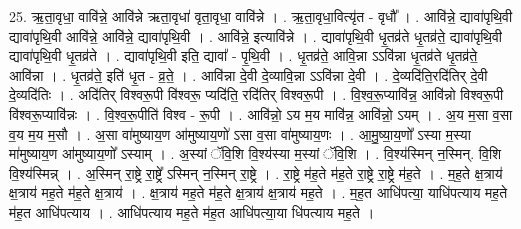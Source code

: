 \documentclass[17pt]{extarticle}
\begin{document}
25. ऋ॒ता॒वृधा॒ वावि॑न्ने॒ आवि॑न्ने ऋता॒वृधा॑ वृता॒वृधा॒ वावि॑न्ने । . ऋ॒ता॒वृधा॒वित्यृ॑त - वृधौ᳚ । . आवि॑न्ने॒ द्यावा॑पृथि॒वी द्यावा॑पृथि॒वी आवि॑न्ने॒ आवि॑न्ने॒ द्यावा॑पृथि॒वी । . आवि॑न्ने॒ इत्यावि॑न्ने । . द्यावा॑पृथि॒वी धृ॒तव्र॑ते धृ॒तव्र॑ते॒ द्यावा॑पृथि॒वी द्यावा॑पृथि॒वी धृ॒तव्र॑ते । . द्यावा॑पृथि॒वी इति॒ द्यावा᳚ - पृ॒थि॒वी । . धृ॒तव्र॑ते॒ आवि॒न्ना ऽऽवि॑न्ना धृ॒तव्र॑ते धृ॒तव्र॑ते॒ आवि॑न्ना । . धृ॒तव्र॑ते॒ इति॑ धृ॒त - व्र॒ते॒ । . आवि॑न्ना दे॒वी दे॒व्यावि॒न्ना ऽऽवि॑न्ना दे॒वी । . दे॒व्यदि॑ति॒रदि॑तिर् दे॒वी दे॒व्यदि॑तिः । . अदि॑तिर् विश्वरू॒पी वि॑श्वरू॒ प्यदि॑ति॒ रदि॑तिर् विश्वरू॒पी । . वि॒श्व॒रू॒प्यावि॑न्न॒ आवि॑न्नो विश्वरू॒पी वि॑श्वरू॒प्यावि॑न्नः । . वि॒श्व॒रू॒पीति॑ विश्व - रू॒पी । . आवि॑न्नो॒ ऽय म॒य मावि॑न्न॒ आवि॑न्नो॒ ऽयम् । . अ॒य म॒सा व॒सा व॒य म॒य म॒सौ । . अ॒सा वा॑मुष्याय॒ण आ॑मुष्याय॒णो॑ ऽसा व॒सा वा॑मुष्याय॒णः । . आ॒मु॒ष्या॒य॒णो᳚ ऽस्या म॒स्या मा॑मुष्याय॒ण आ॑मुष्याय॒णो᳚ ऽस्याम् । . अ॒स्यां ॅवि॒शि वि॒श्य॑स्या म॒स्यां ॅवि॒शि । . वि॒श्य॑स्मिन् न॒स्मिन्. वि॒शि वि॒श्य॑स्मिन्न् । . अ॒स्मिन् रा॒ष्ट्रे रा॒ष्ट्रे᳚ ऽस्मिन् न॒स्मिन् रा॒ष्ट्रे । . रा॒ष्ट्रे म॑ह॒ते म॑ह॒ते रा॒ष्ट्रे रा॒ष्ट्रे म॑ह॒ते । . म॒ह॒ते क्ष॒त्राय॑ क्ष॒त्राय॑ मह॒ते म॑ह॒ते क्ष॒त्राय॑ । . क्ष॒त्राय॑ मह॒ते म॑ह॒ते क्ष॒त्राय॑ क्ष॒त्राय॑ मह॒ते । . म॒ह॒त आधि॑पत्या॒ याधि॑पत्याय मह॒ते म॑ह॒त आधि॑पत्याय । . आधि॑पत्याय मह॒ते म॑ह॒त आधि॑पत्या॒या धि॑पत्याय मह॒ते । \newline
\end{document}
